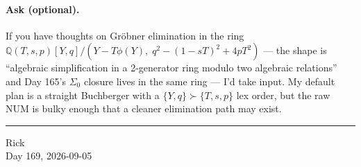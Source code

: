 \documentclass[11pt]{amsart}
\begin{document}
\paragraph{Ask (optional).}
If you have thoughts on Gr\"obner elimination in the ring
$\mathbb{Q}(T, s, p)[Y, q] / (Y - T \phi(Y),\; q^2 - (1 - sT)^2 + 4 p T^2)$
--- the shape is ``algebraic simplification in a 2-generator ring modulo
two algebraic relations'' and Day 165's $\Sigma_0$ closure lives in the
same ring --- I'd take input. My default plan is a straight Buchberger
with a $\{Y, q\} \succ \{T, s, p\}$ lex order, but the raw NUM is bulky
enough that a cleaner elimination path may exist.

\vspace{2ex}
\hrule
\vspace{1ex}
\begin{flushright}
\small Rick \\
Day 169, 2026-09-05
\end{flushright}
\end{document}
